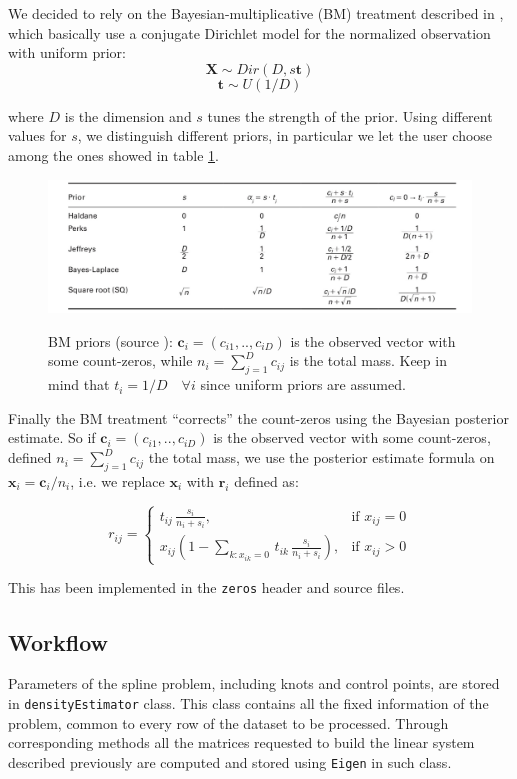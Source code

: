 We decided to rely on the Bayesian-multiplicative (BM) treatment described in \cite{fernandez:zeros}, which basically use a conjugate Dirichlet model for the normalized observation with uniform prior:
\[ \bm{X} \sim Dir(D,s\bm{t}) \]
\[ \bm{t} \sim U(1/D) \]

where $D$ is the dimension and $s$ tunes the strength of the prior. Using different values for $s$, we distinguish different priors, in particular we let the user choose among the ones showed in table \ref{fig:priors}.

\begin{figure}[ht]
	
	
	\includegraphics[width=\textwidth]{./pictures/BM/BMpriors.png}
	\label{fig:priors}
	
	\caption{BM priors (source \cite{fernandez:zeros}): $\bm{c}_{i}=(c_{i1},..,c_{iD})$ is the observed vector with some count-zeros, while $n_{i}=\sum_{j=1}^{D}c_{ij}$ is the total mass. Keep in mind that $t_{i}=1/D \quad \forall i$ since uniform priors are assumed.}
	\label{fig:priors}
	
\end{figure}

Finally the BM treatment ``corrects'' the count-zeros using the Bayesian posterior estimate. So if $\bm{c}_{i}=(c_{i1},..,c_{iD})$ is the observed vector with some count-zeros, defined $n_{i}=\sum_{j=1}^{D}c_{ij}$ the total mass, we use the posterior estimate formula on $\bm{x}_{i}=\bm{c}_{i}/n_{i}$, i.e. we replace $\bm{x}_{i}$ with $\bm{r}_{i}$ defined as:

\[ r_{ij} = 
\begin{cases} 
t_{ij} \, \frac{s_{i}}{n_{i}+s_{i}}, & \mbox{if } x_{ij}=0 \\ 
x_{ij}(1-\sum_{k:x_{ik}=0} \, t_{ik} \, \frac{s_{i}}{n_{i}+s_{i}}), & \mbox{if } x_{ij}>0 
\end{cases} \]

This has been implemented in the \verb|zeros| header and source files.

\subsection{Workflow} \label{workflow}
Parameters of the spline problem, including knots and control points, are stored in \verb|densityEstimator| class. This class contains all the fixed information of the problem, common to every row of the dataset to be processed. Through corresponding methods all the matrices requested to build the linear system described previously are computed and stored using \verb|Eigen| in such class.

